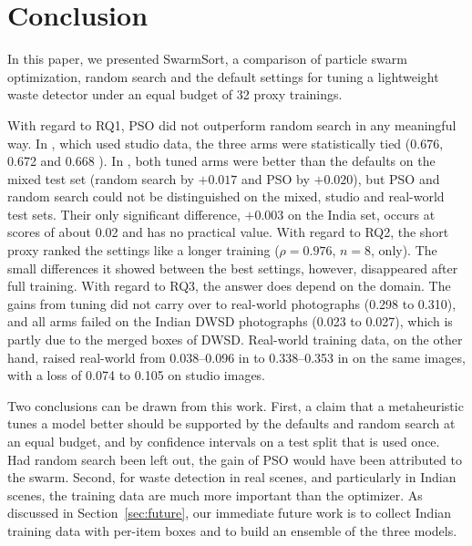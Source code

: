 \section{Conclusion}
\label{sec:conclusion}

In this paper, we presented SwarmSort, a comparison of particle swarm optimization, random search and the default settings for tuning a lightweight waste detector under an equal budget of 32 proxy trainings.

With regard to RQ1, PSO did not outperform random search in any meaningful way. In \genone, which used studio data, the three arms were statistically tied (0.676, 0.672 and 0.668 \mapfifty). In \gentwo, both tuned arms were better than the defaults on the mixed test set (random search by $+0.017$ and PSO by $+0.020$), but PSO and random search could not be distinguished on the mixed, studio and real-world test sets. Their only significant difference, $+0.003$ on the India set, occurs at scores of about 0.02 and has no practical value. With regard to RQ2, the short proxy ranked the settings like a longer training ($\rho = 0.976$, $n = 8$, \genone only). The small differences it showed between the best settings, however, disappeared after full training. With regard to RQ3, the answer does depend on the domain. The gains from tuning did not carry over to real-world photographs (0.298 to 0.310), and all arms failed on the Indian DWSD photographs (0.023 to 0.027), which is partly due to the merged boxes of DWSD. Real-world training data, on the other hand, raised real-world \mapfifty from 0.038--0.096 in \genone to 0.338--0.353 in \gentwo on the same images, with a loss of 0.074 to 0.105 on studio images.

Two conclusions can be drawn from this work. First, a claim that a metaheuristic tunes a model better should be supported by the defaults and random search at an equal budget, and by confidence intervals on a test split that is used once. Had random search been left out, the \gentwo gain of PSO would have been attributed to the swarm. Second, for waste detection in real scenes, and particularly in Indian scenes, the training data are much more important than the optimizer. As discussed in Section~\ref{sec:future}, our immediate future work is to collect Indian training data with per-item boxes and to build an ensemble of the three models.
